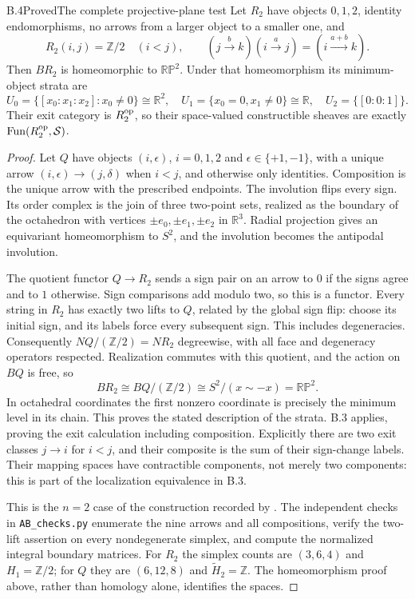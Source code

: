 \begin{statement}{B.4}{Proved}{The complete projective-plane test}
Let $R_2$ have objects $0,1,2$, identity endomorphisms, no arrows from a
larger object to a smaller one, and
\[
 R_2(i,j)=\mathbb Z/2\quad(i<j),\qquad
 (j\xrightarrow{b}k)(i\xrightarrow{a}j)=
       (i\xrightarrow{a+b}k).
\]
Then $BR_2$ is homeomorphic to $\mathbb {RP}^{2}$. Under that
homeomorphism its minimum-object strata are
\[
 U_0=\{[x_0:x_1:x_2]:x_0\ne0\}\cong\mathbb R^2,\quad
 U_1=\{x_0=0, x_1\ne0\}\cong\mathbb R,\quad
 U_2=\{[0:0:1]\}.
\]
Their exit category is $R_2^{\mathrm{op}}$, so their space-valued constructible
sheaves are exactly $\operatorname{Fun}(R_2^{\mathrm{op}},\mathcal S)$.
\end{statement}
\begin{proof}
Let $Q$ have objects $(i,\epsilon)$, $i=0,1,2$ and
$\epsilon\in\{+1,-1\}$, with a unique arrow
$(i,\epsilon)\to(j,\delta)$ when $i<j$, and otherwise only identities.
Composition is the unique arrow with the prescribed endpoints. The
involution flips every sign. Its order complex is the join of three
two-point sets, realized as the boundary of the octahedron with vertices
$\pm e_0,\pm e_1,\pm e_2$ in $\mathbb R^3$.
Radial projection gives an equivariant homeomorphism to $S^2$, and the
involution becomes the antipodal involution.

The quotient functor $Q\to R_2$ sends a sign pair on an arrow to $0$ if
the signs agree and to $1$ otherwise. Sign comparisons add modulo two,
so this is a functor. Every string in $R_2$ has exactly two lifts to
$Q$, related by the global sign flip: choose its initial sign, and its
labels force every subsequent sign. This includes degeneracies.
Consequently $NQ/(\mathbb Z/2)=NR_2$ degreewise, with all face and
degeneracy operators respected. Realization commutes with this quotient,
and the action on $BQ$ is free, so
\[
 BR_2\cong BQ/(\mathbb Z/2)\cong S^2/(x\sim-x)
       =\mathbb {RP}^2.
\]
In octahedral coordinates the first nonzero coordinate is precisely the
minimum level in its chain. This proves the stated description of the
strata. B.3 applies, proving the exit calculation including composition.
Explicitly there are two exit classes $j\to i$ for $i<j$, and their
composite is the sum of their sign-change labels. Their mapping spaces
have contractible components, not merely two components: this is part
of the localization equivalence in B.3.

This is the $n=2$ case of the construction recorded by
\citet[Theorem 6.2]{Carcacia2026}. The independent checks in
\texttt{AB\_checks.py} enumerate the nine arrows and all compositions,
verify the two-lift assertion on every nondegenerate simplex, and compute
the normalized integral boundary matrices. For $R_2$ the simplex counts
are $(3,6,4)$ and $H_1=\mathbb Z/2$; for $Q$ they are $(6,12,8)$ and
$\widetilde H_2=\mathbb Z$. The homeomorphism proof above, rather than
homology alone, identifies the spaces.
\end{proof}

